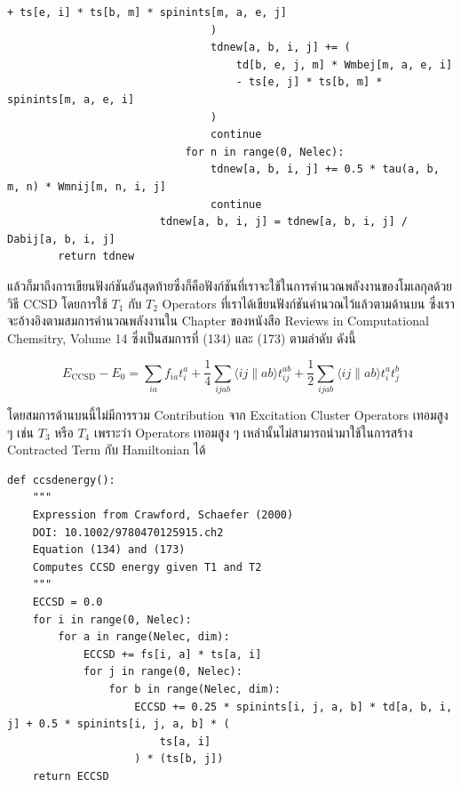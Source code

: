 \begin{lstlisting}[style=MyPython]
                                    + ts[e, i] * ts[b, m] * spinints[m, a, e, j]
                                )
                                tdnew[a, b, i, j] += (
                                    td[b, e, j, m] * Wmbej[m, a, e, i]
                                    - ts[e, j] * ts[b, m] * spinints[m, a, e, i]
                                )
                                continue
                            for n in range(0, Nelec):
                                tdnew[a, b, i, j] += 0.5 * tau(a, b, m, n) * Wmnij[m, n, i, j]
                                continue
                        tdnew[a, b, i, j] = tdnew[a, b, i, j] / Dabij[a, b, i, j]
        return tdnew
\end{lstlisting}

\vspace{5pt}

แล้วก็มาถึงการเขียนฟังก์ชันอันสุดท้ายซึ่งก็คือฟังก์ชันที่เราจะใช้ในการคำนวณพลังงานของโมเลกุลด้วยวิธี CCSD โดยการใช้ $T_{1}$ กับ $T_{2}$
Operators ที่เราได้เขียนฟังก์ชันคำนวณไว้แล้วตามด้านบน ซึ่งเราจะอ้างอิงตามสมการคำนวณพลังงานใน Chapter ของหนังสือ Reviews in
Computational Chemsitry, Volume 14\autocite{crawford2000} ซึ่งเป็นสมการที่ (134) และ (173) ตามลำดับ ดังนี้

\begin{equation}
  E_{\mathrm{CCSD}}-E_0
  =
  \sum_{i a}
  f_{i a} t_i^a
  + \frac{1}{4} \sum_{i j a b}\langle i j \| a b\rangle t_{i j}^{a b}
  + \frac{1}{2} \sum_{i j a b}\langle i j \| a b\rangle t_i^a t_j^b
\end{equation}

\noindent โดยสมการด้านบนนี้ไม่มีการรวม Contribution จาก Excitation Cluster Operators เทอมสูง ๆ เช่น $T_{3}$ หรือ $T_{4}$
เพราะว่า Operators เทอมสูง ๆ เหล่านั้นไม่สามารถนำมาใช้ในการสร้าง Contracted Term กับ Hamiltonian ได้

\vspace{5pt}

\begin{lstlisting}[style=MyPython]
def ccsdenergy():
    """
    Expression from Crawford, Schaefer (2000)
    DOI: 10.1002/9780470125915.ch2
    Equation (134) and (173)
    Computes CCSD energy given T1 and T2
    """
    ECCSD = 0.0
    for i in range(0, Nelec):
        for a in range(Nelec, dim):
            ECCSD += fs[i, a] * ts[a, i]
            for j in range(0, Nelec):
                for b in range(Nelec, dim):
                    ECCSD += 0.25 * spinints[i, j, a, b] * td[a, b, i, j] + 0.5 * spinints[i, j, a, b] * (
                        ts[a, i]
                    ) * (ts[b, j])
    return ECCSD
\end{lstlisting}

